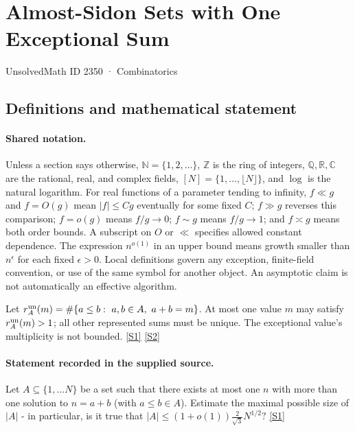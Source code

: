 \documentclass[11pt,a4paper]{article}
\newcommand{\N}{\mathbb{N}}
\newcommand{\Z}{\mathbb{Z}}
\newcommand{\Q}{\mathbb{Q}}
\newcommand{\R}{\mathbb{R}}
\newcommand{\C}{\mathbb{C}}
\newcommand{\sref}[2]{\hyperlink{source:#1:#2}{[S#2]}}
\begin{document}

\setcounter{section}{2349}

\section{Almost-Sidon Sets with One Exceptional Sum}\label{2350}

{\small\sffamily UnsolvedMath ID 2350 · Combinatorics}

\subsection{Definitions and mathematical statement}

\paragraph{Shared notation.}Unless a section says otherwise, $\N=\{1,2,\ldots\}$,
$\Z$ is the ring of integers, $\Q,\R,\C$ are the rational, real, and complex
fields, $[N]=\{1,\ldots,\lfloor N\rfloor\}$, and $\log$ is the natural
logarithm. For real functions of a parameter tending to infinity,
$f\ll g$ and $f=O(g)$ mean $|f|\leq Cg$ eventually for some fixed $C$;
$f\gg g$ reverses this comparison; $f=o(g)$ means $f/g\to0$;
$f\sim g$ means $f/g\to1$; and $f\asymp g$ means both order bounds.
A subscript on $O$ or $\ll$ specifies allowed constant dependence.
The expression $n^{o(1)}$ in an upper bound means growth smaller than
$n^\epsilon$ for each fixed $\epsilon>0$. Local definitions govern any
exception, finite-field convention, or use of the same symbol for another
object. An asymptotic claim is not automatically an effective algorithm.



Let $r_A^{\rm un}(m)=\#\{a\leq b:\ a,b\in A,\ a+b=m\}$. At most one value $m$ may satisfy $r_A^{\rm un}(m)>1$; all other represented sums must be unique. The exceptional value's multiplicity is not bounded. \sref{2350}{1} \sref{2350}{2}

\paragraph{Statement recorded in the supplied source.}
Let $A\subseteq \{1,\ldots N\}$ be a set such that there exists at most one $n$ with more than one solution to $n=a+b$ (with $a\leq b\in A$). Estimate the maximal possible size of $\lvert A\rvert$ - in particular, is it true that $ \lvert A\rvert \leq (1+o(1))\frac{2}{\sqrt{3}}N^{1/2}? $ \sref{2350}{1}
\end{document}
